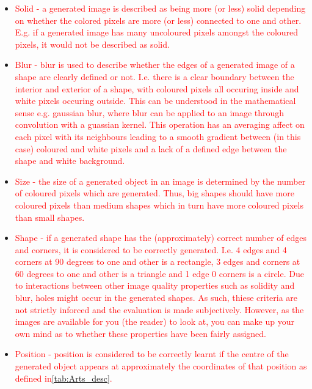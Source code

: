 \begin{itemize}
\item \textcolor{red}{Solid - a generated image is described as being more (or less) solid depending on whether the colored pixels are more (or less) connected to one and other. E.g. if a generated image has many uncoloured pixels amongst the coloured pixels, it would not be described as solid.}

\item \textcolor{red}{Blur - blur is used to describe whether the edges of a generated image of a shape are clearly defined or not. I.e. there is a clear boundary between the interior and exterior of a shape, with coloured pixels all occuring inside and white pixels occuring outside. This can be understood in the mathematical sense e.g. gaussian blur, where blur can be applied to an image through convolution with a guassian kernel. This operation has an averaging affect on each pixel with its neighbours leading to a smooth gradient between (in this case) coloured and white pixels and a lack of a defined edge between the shape and white background.}

\item \textcolor{red}{Size - the size of a generated object in an image is determined by the number of coloured pixels which are generated. Thus, big shapes should have more coloured pixels than medium shapes which in turn have more coloured pixels than small shapes.}

\item \textcolor{red}{Shape - if a generated shape has the (approximately) correct number of edges and corners, it is considered to be correctly generated. I.e. 4 edges and 4 corners at 90 degrees to one and other is a rectangle, 3 edges and corners at 60 degrees to one and other is a triangle and 1 edge 0 corners is a circle. Due to interactions between other image quality properties such as solidity and blur, holes might occur in the generated shapes. As such, thiese criteria are not strictly inforced and the evaluation is made subjectively. However, as the images are available for you (the reader) to look at, you can make up your own mind as to whether these properties have been fairly assigned.}

\item \textcolor{red}{Position - position is considered to be correctly learnt if the centre of the generated object appears at approximately the coordinates of that position as defined in\autoref{tab:Arts_desc}.}
\end{itemize}  


